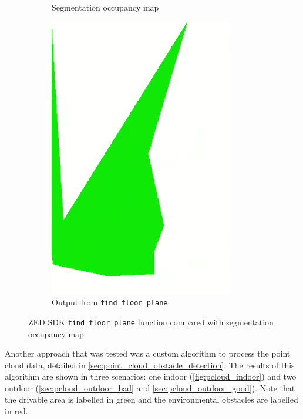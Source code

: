 \begin{figure}[b]
\begin{subfigure}{.2\textwidth}
        \caption{Segmentation occupancy map}
    \end{subfigure}
    \quad
    \begin{subfigure}{.2\textwidth}
        \centering
        \includegraphics[width=\linewidth]{images/find_floor_plane.PNG}
        \caption{Output from \texttt{find\_floor\_plane}}
    \end{subfigure}
    \caption{ZED SDK \texttt{find\_floor\_plane} function compared with segmentation occupancy map}
    \label{fig:find_floor_plane}
\end{figure}

Another approach that was tested was a custom algorithm to process the point cloud data,
detailed in \cref{sec:point_cloud_obstacle_detection}. The results of this algorithm
are shown in three scenarios: one indoor (\cref{fig:pcloud_indoor}) and two outdoor (\cref{sec:pcloud_outdoor_bad} and \cref{sec:pcloud_outdoor_good}).
Note that the drivable area is labelled in green and the environmental obstacles are labelled in red.

